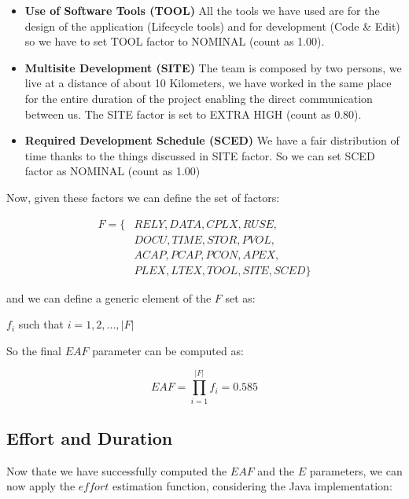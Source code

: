 \documentclass[../../../../projectPlan.tex]{subfiles}
\begin{document}
\begin{itemize}
				
				\item \textbf{Use of Software Tools (TOOL)}
				      All the tools we have used are for the design of the application (Lifecycle tools) and for development (Code \& Edit) so we have to set TOOL factor to NOMINAL (count as 1.00). 
				
				\item \textbf{Multisite Development (SITE)}
				      The team is composed by two persons, we live at a distance of about 10 Kilometers, we have worked in the same place for the entire duration of the project enabling the direct communication between us. The SITE factor is set to EXTRA HIGH (count as 0.80).
				
				\item \textbf{Required Development Schedule (SCED)}
				      We have a fair distribution of time thanks to the things discussed in SITE factor.
				      So we can set SCED factor as NOMINAL (count as 1.00)

			\end{itemize}

			Now, given these factors we can define the set of factors:

			\begin{align*}
			    F = \{ & RELY, DATA, CPLX, RUSE,\\
			          & DOCU, TIME, STOR, PVOL,\\
			          & ACAP, PCAP, PCON, APEX,\\
			          & PLEX, LTEX, TOOL, SITE, SCED \}
		    \end{align*}

		    and we can define a generic element of the \(F\) set as:

		    \begin{center}
		    	\(f_i\) such that \(i=1,2,...,|F|\)
		    \end{center}

		    So the final \(EAF\) parameter can be computed as:

		    \[EAF = \prod_{i=1}^{|F|} f_i = 0.585\]

		\subsection{Effort and Duration}

			Now thate we have successfully computed the \(EAF\) and the \(E\) parameters, we can now apply the \(effort\) estimation function, considering the Java implementation:
\end{document}

